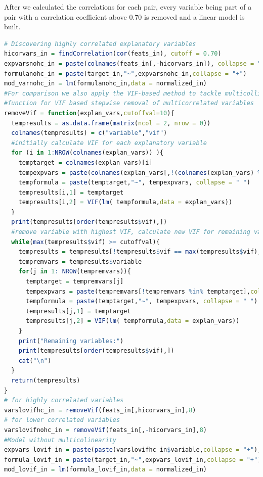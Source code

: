 \documentclass[11pt]{article}
\begin{document}
After we calculated the correlations for each pair, every variable being part of a pair with a correlation coefficient above 0.70 is removed and a linear model is built.
\begin{lstlisting}[language= R, captionpos=b,caption=\href{https://github.com/jaidikam/sps_ws1718/tree/master/Qfolder3}{SPL\_Q3\_india\_impvar\_vif}]
# Discovering highly correlated explanatory variables
hicorvars_in = findCorrelation(cor(feats_in), cutoff = 0.70)
expvarsnohc_in = paste(colnames(feats_in[,-hicorvars_in]), collapse = "+")
formulanohc_in = paste(target_in,"~",expvarsnohc_in,collapse = "+")
mod_varnohc_in = lm(formulanohc_in,data = normalized_in)
#For comparison we also apply the VIF-based method to tackle multicollinearity:
#function for VIF based stepwise removal of multicorrelated variables
removeVif = function(explan_vars,cutoffval=10){
  tempresults = as.data.frame(matrix(ncol = 2, nrow = 0))
  colnames(tempresults) = c("variable","vif")
  #initially calculate VIF for each explanatory variable
  for (i in 1:NROW(colnames(explan_vars)) ){
    temptarget = colnames(explan_vars)[i]
    tempexpvars = paste(colnames(explan_vars[,!(colnames(explan_vars) %in% temptarget)]),collapse = "+")
    tempformula = paste(temptarget,"~", tempexpvars, collapse = " ")
    tempresults[i,1] = temptarget 
    tempresults[i,2] = VIF(lm( tempformula,data = explan_vars))
  }
  print(tempresults[order(tempresults$vif),])
  #remove variable with highest VIF, calculate new VIF for remaining variables until all VIF are below cutoff value
  while(max(tempresults$vif) >= cutoffval){
    tempresults = tempresults[!tempresults$vif == max(tempresults$vif),]
    tempremvars = tempresults$variable
    for(j in 1: NROW(tempremvars)){
      temptarget = tempremvars[j]
      tempexpvars = paste(tempremvars[!tempremvars %in% temptarget],collapse = "+")
      tempformula = paste(temptarget,"~", tempexpvars, collapse = " ")
      tempresults[j,1] = temptarget 
      tempresults[j,2] = VIF(lm( tempformula,data = explan_vars))
    }
    print("Remaining variables:")
    print(tempresults[order(tempresults$vif),])
    cat("\n") 
  }
  return(tempresults)
}
# for highly correlated variables
varslovifhc_in = removeVif(feats_in[,hicorvars_in],8) 
# for lower correlated variables
varslovifnohc_in = removeVif(feats_in[,-hicorvars_in],8) 
#Model without multicolinearity
expvars_lovif_in = paste(paste(varslovifhc_in$variable,collapse = "+"),"+",paste(varslovifnohc_in$variable,collapse = "+"),collapse = "+")
formula_lovif_in = paste(target_in,"~",expvars_lovif_in,collapse = "+")
mod_lovif_in = lm(formula_lovif_in,data = normalized_in)
\end{lstlisting}
\end{document}

